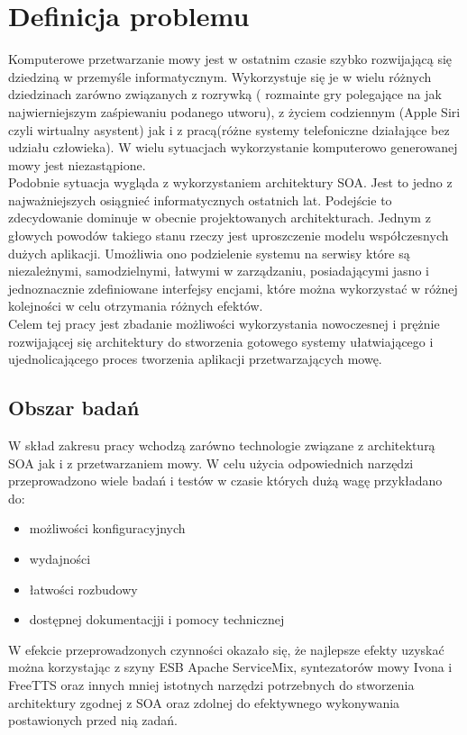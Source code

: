 \section{Definicja problemu } %
Komputerowe przetwarzanie mowy jest w ostatnim czasie szybko rozwijającą się dziedziną w przemyśle informatycznym. Wykorzystuje się je w wielu różnych dziedzinach zarówno związanych z rozrywką ( rozmainte gry polegające na jak najwierniejszym zaśpiewaniu podanego utworu), z życiem codziennym (Apple Siri czyli wirtualny asystent) jak i z pracą(różne systemy telefoniczne działające bez udziału człowieka). W wielu sytuacjach wykorzystanie komputerowo generowanej mowy jest niezastąpione.\\
Podobnie sytuacja wygląda z wykorzystaniem architektury SOA. Jest to jedno z najważniejszych osiągnieć informatycznych ostatnich lat. Podejście to zdecydowanie dominuje w obecnie projektowanych architekturach. Jednym z głowych powodów takiego stanu rzeczy jest uproszczenie modelu współczesnych dużych aplikacji. Umożliwia ono podzielenie systemu na serwisy które są niezależnymi, samodzielnymi, łatwymi w zarządzaniu, posiadającymi jasno i jednoznacznie zdefiniowane interfejsy encjami, które można wykorzystać w różnej kolejności w celu otrzymania różnych efektów. \\
Celem tej pracy jest zbadanie możliwości wykorzystania nowoczesnej i prężnie rozwijającej się architektury do stworzenia gotowego systemy ułatwiającego i ujednolicającego proces tworzenia aplikacji przetwarzających mowę.
 


\subsection{Obszar badań} %
W skład zakresu pracy wchodzą zarówno technologie związane z architekturą SOA jak i z przetwarzaniem mowy. W celu użycia odpowiednich narzędzi przeprowadzono wiele badań i testów w czasie których dużą wagę przykładano do:
\begin{itemize}
 	\item możliwości konfiguracyjnych
	\item wydajności
	\item łatwości rozbudowy
	\item dostępnej dokumentacjji i pomocy technicznej
\end{itemize}
W efekcie przeprowadzonych czynności okazało się, że najlepsze efekty uzyskać można korzystając z szyny ESB  Apache ServiceMix,  syntezatorów mowy Ivona i FreeTTS oraz innych mniej istotnych narzędzi potrzebnych do stworzenia architektury zgodnej z SOA oraz zdolnej do efektywnego wykonywania postawionych przed nią zadań. 


